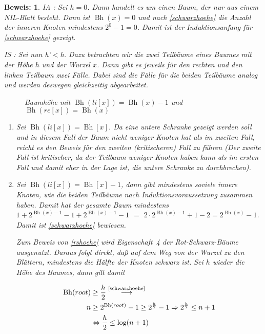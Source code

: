 \documentclass[ngerman,draft,parskip=half*,twoside]{scrreprt}
\theoremstyle{break}
\theoremstyle{nonumberbreak}
\newtheorem{beweis}{Beweis:}
\DeclareMathOperator{\Bh}{Bh}       %
\begin{document}
\begin{beweis} 
 IA : Sei $h=0$. Dann handelt es um einen Baum, der nur aus einem NIL-Blatt besteht. Dann ist $\Bh(x)=0$ und nach \autoref{schwarzhoehe} 
 die Anzahl der inneren Knoten mindestens $2^0-1=0$. Damit ist der Induktionsanfang für \autoref{schwarzhoehe} gezeigt. 
 
  IS : Sei nun h'$<$h. Dazu betrachten wir die zwei Teilbäume eines Baumes mit der Höhe $h$ und der Wurzel $x$.
Dann gibt es jeweils für den rechten und den linken Teilbaum zwei Fälle. Dabei sind die Fälle für die beiden Teilbäume analog und
 werden deswegen gleichzeitig abgearbeitet.

    \begin{figure}[H]
    \centering
    \caption{Baumhöhe mit $\Bh(li[x])=\Bh(x)-1$ und $\Bh(re[x])=\Bh(x)$}
    \label{241103d}
 \end{figure} 
 \begin{enumerate}[1.\,F{a}ll]
 \item Sei $\Bh(li[x]) = \Bh[x]$. Da eine untere Schranke gezeigt
   werden soll und in diesem Fall der Baum nicht weniger Knoten hat
   als im zweiten Fall, reicht es den Beweis für den zweiten
   (kritischeren) Fall zu führen (Der zweite Fall ist kritischer, da
   der Teilbaum weniger Knoten haben kann als im ersten Fall und damit
   eher in der Lage ist, die untere Schranke zu durchbrechen).
 \item Sei $\Bh(li[x]) = \Bh[x]-1$, dann gibt mindestens soviele
   innere Knoten, wie die beiden Teilbäume nach
   Induktionsvoraussetzung zusammen haben. Damit hat der gesamte Baum
   mindestens $1+2^{\Bh(x)-1}-1+2^{\Bh(x)-1}-1$ $=$ $2 \cdot
   2^{\Bh(x)-1}+1-2 = 2^{\Bh(x)}-1$. Damit ist \autoref{schwarzhoehe}
   bewiesen.
    
   Zum Beweis von \autoref{rshoehe} wird Eigenschaft~4 der
   Rot-Schwarz-Bäume ausgenutzt. Daraus folgt direkt, daß auf dem Weg
   von der Wurzel zu den Blättern, mindestens die Hälfte der Knoten
   schwarz ist. Sei $h$ wieder die Höhe des Baumes, dann gilt
   damit

\begin{align*}
  \Bh(root) &\geq\frac{h}{2}\stackrel{\text{\autoref{schwarzhoehe}}}{\longrightarrow}\\
  n &\geq 2^{\Bh(root)}-1 \geq 2^{\frac{h}{2}}-1 \Rightarrow 2^{\frac{h}{2}}\leq n+1\\
  &\Leftrightarrow \frac{h}{2}\leq \log(n+1)
\end{align*}
 \end{enumerate}
\end{beweis} 
\end{document}
